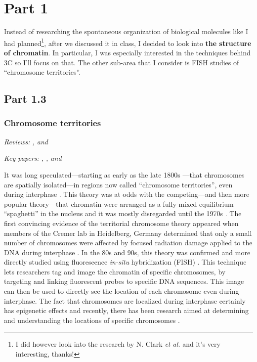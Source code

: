 \documentclass[12pt]{article}
\begin{document}
\section*{Part 1}

Instead of researching the spontaneous organization of biological molecules
like I had planned\footnote{I did however look into the research by N. Clark
\emph{et al.} and it's very interesting, thanks!}, after we discussed
it in class, I decided to look into {\bf the structure of chromatin}.
In particular, I was especially interested in the techniques behind 3C so I'll
focus on that.
The other sub-area that I consider is FISH studies of ``chromosome
territories''.

\subsection*{Part 1.3}

\subsubsection*{Chromosome territories}

\emph{Reviews: \cite{ct-review3}, \cite{ct-review2} and \cite{ct-review1}}

\noindent\emph{Key papers: \cite{hamster}, \cite{cremer}, and \cite{local}}

It was long speculated---starting as early as the late 1800s
\cite{old}---that chromosomes are spatially isolated---in regions now called
``chromosome territories'', even during interphase \cite{ct-review1,
ct-review2}.
This theory was at odds with the competing---and then more popular
theory---that chromatin were arranged as a fully-mixed equilibrium
``spaghetti'' in the nucleus and it was mostly disregarded until the 1970s
\cite{cremer}.
The first convincing evidence of the territorial chromosome theory appeared
when members of the Cremer lab in Heidelberg, Germany determined that only a
small number of chromosomes were affected by focused radiation damage applied
to the DNA during interphase \cite{zorn, hamster}.
In the 80s and 90s, this theory was confirmed and more directly studied using
fluorescence \emph{in-situ} hybridization (FISH) \cite{cremer}.
This technique lets researchers tag and image the chromatin of specific
chromosomes, by targeting and linking fluorescent probes to specific DNA
sequences.
This image can then be used to directly see the location of each chromosome
even during interphase.
The fact that chromosomes are localized during interphase certainly has
epigenetic effects and recently, there has been research aimed at determining
and understanding the locations of specific chromosomes \cite{local}.
\end{document}
